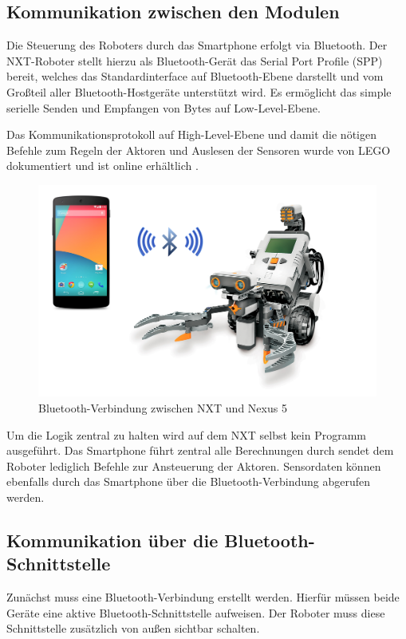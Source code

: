 \subsection{Kommunikation zwischen den Modulen}

Die Steuerung des Roboters durch das Smartphone erfolgt via Bluetooth. Der NXT-Roboter stellt hierzu als Bluetooth-Gerät das Serial Port Profile (SPP) bereit, welches das Standardinterface auf Bluetooth-Ebene darstellt und vom Großteil aller Bluetooth-Hostgeräte unterstützt wird. Es ermöglicht das simple serielle Senden und Empfangen von Bytes auf Low-Level-Ebene.

Das Kommunikationsprotokoll auf High-Level-Ebene und damit die nötigen Befehle zum Regeln der Aktoren und Auslesen der Sensoren wurde von LEGO dokumentiert und ist online erhältlich \cite{nxt_comm_protocol}.

\begin{figure}[h]
\centering
\includegraphics[width=\textwidth/2]{Bilder/Robot/bluetooth}
\caption{Bluetooth-Verbindung zwischen NXT und Nexus 5}
\label{fig:bluetooth}
\end{figure}

Um die Logik zentral zu halten wird auf dem NXT selbst kein Programm ausgeführt. Das Smartphone führt zentral alle Berechnungen durch sendet dem Roboter lediglich Befehle zur Ansteuerung der Aktoren. Sensordaten können ebenfalls durch das Smartphone über die Bluetooth-Verbindung abgerufen werden.

\subsection{Kommunikation über die Bluetooth-Schnittstelle}

Zunächst muss eine Bluetooth-Verbindung erstellt werden. Hierfür müssen beide Geräte eine aktive Bluetooth-Schnittstelle aufweisen. Der Roboter muss diese Schnittstelle zusätzlich von außen sichtbar schalten.

